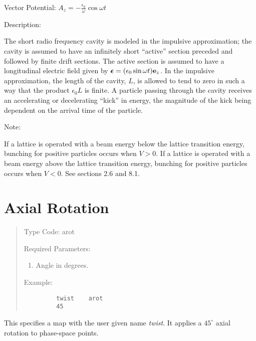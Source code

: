 \vspace{5mm}
     Vector Potential:  $\displaystyle A_z  = -\frac{\epsilon_0}{\omega} \cos \omega t$

\vspace{5mm}
     Description:
\vspace{2mm}

         The short radio frequency cavity is modeled in the impulsive
approximation; the cavity is assumed to have an infinitely short ``active''
section preceded and followed by finite drift sections.  The active section
is assumed to have a longitudinal electric field given by \linebreak
${\mbox{\boldmath$\epsilon$}}=(\epsilon_0 \sin \omega t) {\bf e}_z$.  In the impulsive approximation, the length of the
cavity, $L$, is allowed to tend to zero in such a way that the product $\epsilon_0 L$ is
finite.  A particle passing through the cavity receives an accelerating or
decelerating ``kick'' in energy, the magnitude of the kick being dependent on
the arrival time of the particle.

\vspace{5mm}
     Note:
\vspace{2mm}

         If a lattice is operated with a beam energy below the lattice
transition energy, bunching for positive particles occurs when $V > 0$.  If a lattice is operated
with a beam energy above the lattice transition energy, bunching for
positive particles occurs
when $V < 0$.  See sections 2.6 and 8.1.

\clearpage



\section{Axial Rotation}
\begin{quotation}
\noindent    Type Code:  arot
\vspace{5mm}

\noindent Required Parameters:
\begin{enumerate}
     \item  Angle in degrees.
\end{enumerate}

\vspace{5mm}
\noindent     Example:
\begin{verbatim}
         twist    arot
         45
\end{verbatim}
\end{quotation}
This specifies a map with the user given name {\em twist}.  It applies a $45^\circ$ axial rotation to phase-space points.

